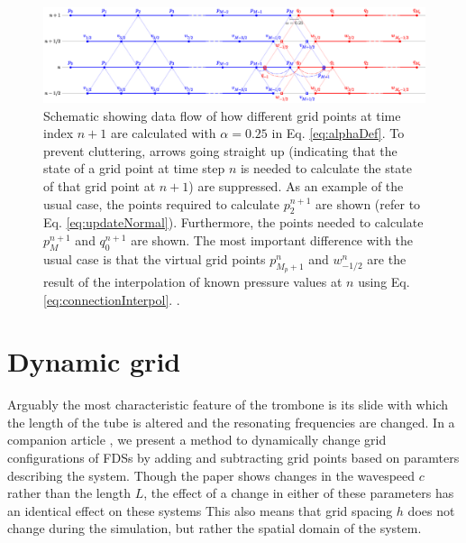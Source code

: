 \begin{figure}[t]
    \centering
    \includegraphics[width = \textwidth]{Figures/tromboneSchematic.eps}
    \caption{Schematic showing data flow of how different grid points at time index $n+1$ are calculated with $\alpha = 0.25$ in Eq. \eqref{eq:alphaDef}. To prevent cluttering, arrows going straight up (indicating that the state of a grid point at time step $n$ is needed to calculate the state of that grid point at $n+1$) are suppressed. As an example of the usual case, the points required to calculate $p_2^{n+1}$ are shown (refer to Eq. \eqref{eq:updateNormal}). Furthermore, the points needed to calculate $p_{M}^{n+1}$ and $q_0^{n+1}$ are shown. The most important difference with the usual case is that the virtual grid points $p_{M_p+1}^n$ and $w_{-1/2}^n$ 
    are the result of the interpolation of known pressure values at $n$ using Eq. \eqref{eq:connectionInterpol}. %
    .
    \label{fig:dynamicGridSchematic}}
\end{figure}

\section{Dynamic grid}\label{sec:dynamicGrid}
Arguably the most characteristic feature of the trombone is its slide with which the length of the tube is altered and the resonating frequencies are changed. In a companion article \cite{Willemsen2021}, we present a method to dynamically change grid configurations of FDSs by adding and subtracting grid points based on paramters describing the system. Though the paper shows changes in the wavespeed $c$ rather than the length $L$, the effect of a change in either of these parameters has an identical effect on these systems  This also means that grid spacing $h$ does not change during the simulation, but rather the spatial domain of the system.

